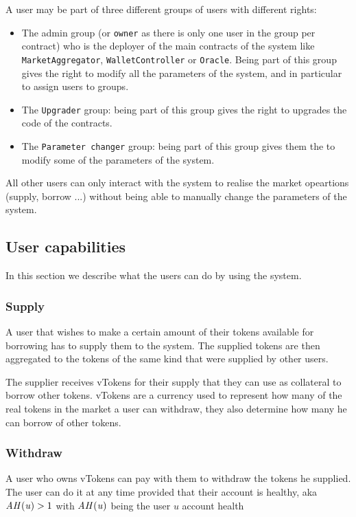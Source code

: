 A user may be part of three different groups of users with different rights:
\begin{itemize}
  \item The admin group (or \verb|owner| as there is only one user in the group per contract) who is the deployer of the main contracts of the system like \verb|MarketAggregator|, \verb|WalletController| or \verb|Oracle|.
Being part of this group gives the right to modify all the parameters of the system, and in particular to assign users to groups.
  \item The \verb|Upgrader| group: being part of this group gives the right to upgrades the code of the contracts.
  \item The \verb|Parameter changer| group: being part of this group gives them the to modify some of the parameters of the system.
\end{itemize}

All other users can only interact with the system to realise the market opeartions (supply, borrow ...) without being able to manually change the parameters of the system.

\subsection{User capabilities}

In this section we describe what the users can do by using the system.

\subsubsection{Supply}

A user that wishes to make a certain amount of their tokens available for borrowing has to supply them to the system. The supplied tokens are then aggregated to the tokens of the same kind that were supplied by other users.

The supplier receives vTokens for their supply that they can use as collateral to borrow other tokens. vTokens are a currency used to represent how many of the real tokens in the market a user can withdraw, they also determine how many he can borrow of other tokens.

\subsubsection{Withdraw}

A user who owns vTokens can pay with them to withdraw the tokens he supplied. The user can do it at any time provided that their account is healthy, aka $\mathit{AH(u)} > 1$ with $\mathit{AH(u)}$ being the user $u$ account health

